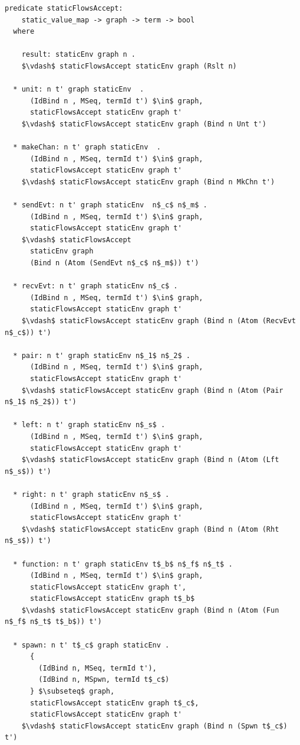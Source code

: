 \documentclass[letterpaper, 11pt]{extarticle}
\begin{document}
\begin{lstlisting}[language=logic, mathescape]
  predicate staticFlowsAccept:
    static_value_map -> graph -> term -> bool
  where

    result: staticEnv graph n .
    $\vdash$ staticFlowsAccept staticEnv graph (Rslt n)

  * unit: n t' graph staticEnv  .
      (IdBind n , MSeq, termId t') $\in$ graph,
      staticFlowsAccept staticEnv graph t'
    $\vdash$ staticFlowsAccept staticEnv graph (Bind n Unt t')

  * makeChan: n t' graph staticEnv  .
      (IdBind n , MSeq, termId t') $\in$ graph,
      staticFlowsAccept staticEnv graph t'
    $\vdash$ staticFlowsAccept staticEnv graph (Bind n MkChn t')

  * sendEvt: n t' graph staticEnv  n$_c$ n$_m$ .
      (IdBind n , MSeq, termId t') $\in$ graph, 
      staticFlowsAccept staticEnv graph t'
    $\vdash$ staticFlowsAccept
      staticEnv graph
      (Bind n (Atom (SendEvt n$_c$ n$_m$)) t')

  * recvEvt: n t' graph staticEnv n$_c$ .
      (IdBind n , MSeq, termId t') $\in$ graph,
      staticFlowsAccept staticEnv graph t'
    $\vdash$ staticFlowsAccept staticEnv graph (Bind n (Atom (RecvEvt n$_c$)) t')

  * pair: n t' graph staticEnv n$_1$ n$_2$ .
      (IdBind n , MSeq, termId t') $\in$ graph,
      staticFlowsAccept staticEnv graph t'
    $\vdash$ staticFlowsAccept staticEnv graph (Bind n (Atom (Pair n$_1$ n$_2$)) t')

  * left: n t' graph staticEnv n$_s$ .
      (IdBind n , MSeq, termId t') $\in$ graph,
      staticFlowsAccept staticEnv graph t'
    $\vdash$ staticFlowsAccept staticEnv graph (Bind n (Atom (Lft n$_s$)) t')

  * right: n t' graph staticEnv n$_s$ .
      (IdBind n , MSeq, termId t') $\in$ graph,
      staticFlowsAccept staticEnv graph t'
    $\vdash$ staticFlowsAccept staticEnv graph (Bind n (Atom (Rht n$_s$)) t')

  * function: n t' graph staticEnv t$_b$ n$_f$ n$_t$ .
      (IdBind n , MSeq, termId t') $\in$ graph,
      staticFlowsAccept staticEnv graph t', 
      staticFlowsAccept staticEnv graph t$_b$
    $\vdash$ staticFlowsAccept staticEnv graph (Bind n (Atom (Fun n$_f$ n$_t$ t$_b$)) t')

  * spawn: n t' t$_c$ graph staticEnv .
      {
        (IdBind n, MSeq, termId t'),
        (IdBind n, MSpwn, termId t$_c$)
      } $\subseteq$ graph, 
      staticFlowsAccept staticEnv graph t$_c$, 
      staticFlowsAccept staticEnv graph t'
    $\vdash$ staticFlowsAccept staticEnv graph (Bind n (Spwn t$_c$) t')


\end{lstlisting}
\end{document}
